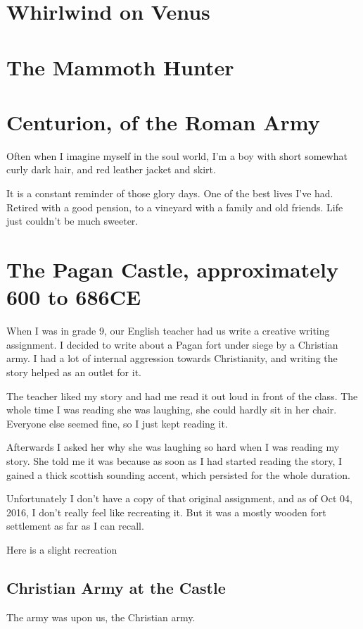 \chapter{Whirlwind on Venus}
\chapter{The Mammoth Hunter}
\chapter{Centurion, of the Roman Army}

Often when I imagine myself in the soul world, I'm a boy with short somewhat
curly dark hair, and red leather jacket and skirt. 

It is a constant reminder of those glory days. 
One of the best lives I've had. Retired with a good pension, to a vineyard with
a family and old friends. Life just couldn't be much sweeter. 

\chapter{The Pagan Castle, approximately 600 to 686CE}
When I was in grade 9, our English teacher had us write a creative writing
assignment. I decided to write about a Pagan fort under siege by a Christian
army.  I had a lot of internal aggression towards Christianity, and writing the
story helped as an outlet for it. 

The teacher liked my story and had me read it out loud in front of the class.
The whole time I was reading she was laughing, she could hardly sit in her
chair. Everyone else seemed fine, so I just kept reading it. 

Afterwards I asked her why she was laughing so hard when I was reading my story. 
She told me it was because as soon as I had started reading the story, I gained
a thick scottish sounding accent, which persisted for the whole duration. 

Unfortunately I don't have a copy of that original assignment, and as of Oct
04, 2016, I don't really feel like recreating it. But it was a mostly wooden 
fort settlement as far as I can recall. 

Here is a slight recreation

\section{Christian Army at the Castle}
The army was upon us, the Christian army.

